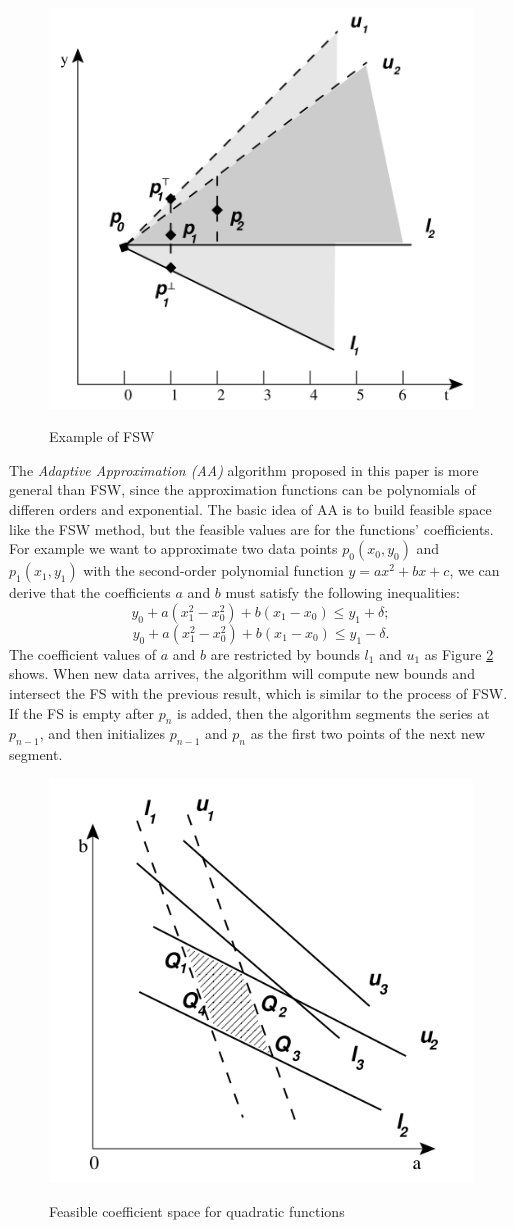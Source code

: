 \documentclass[paper=a4, fontsize=18pt]{article} %
\numberwithin{equation}{section} %
\numberwithin{figure}{section} %
\numberwithin{table}{section} %
\begin{document}
\begin{figure}[h]
  \centering
  \includegraphics[width=.5\linewidth]{7_11_fsw_example.png}\\
  \caption{Example of FSW}\label{fig:fsw_example}
\end{figure}


The \emph{Adaptive Approximation (AA)} algorithm proposed in this paper is more general than FSW, since the approximation functions can be polynomials of differen orders and exponential. The basic idea of AA is to build feasible space like the FSW method, but the feasible values are for the functions' coefficients. For example we want to approximate two data points $p_0(x_0, y_0)$ and $p_1(x_1, y_1)$ with the second-order polynomial function $y = ax^2 + bx + c$, we can derive that the coefficients $a$ and $b$ must satisfy the following inequalities:
$$y_0 + a(x_1^2-x_0^2) + b(x_1-x_0) \leq y_1 + \delta;$$
$$y_0 + a(x_1^2-x_0^2) + b(x_1-x_0) \leq y_1 - \delta.$$
The coefficient values of $a$ and $b$ are restricted by bounds $l_1$ and $u_1$ as Figure \ref{fig:space} shows. When new data arrives, the algorithm will compute new bounds and intersect the FS with the previous result, which is similar to the process of FSW. If the FS is empty after $p_n$ is added, then the algorithm segments the series at $p_{n-1}$, and then initializes $p_{n-1}$ and $p_n$ as the first two points of the next new segment.

\begin{figure}[h]
  \centering
  \includegraphics[width=.5\linewidth]{7_11_space.png}\\
  \caption{Feasible coefficient space for quadratic functions}\label{fig:space}
\end{figure}
\end{document}
